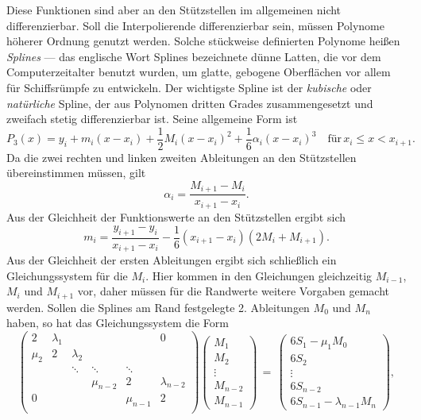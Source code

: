 Diese Funktionen sind aber an den Stützstellen im allgemeinen nicht
differenzierbar. Soll die Interpolierende differenzierbar sein, müssen
Polynome höherer Ordnung genutzt werden. Solche stückweise definierten
Polynome heißen \emph{Splines} --- das englische Wort Splines
bezeichnete dünne Latten, die vor dem Computerzeitalter benutzt
wurden, um glatte, gebogene Oberflächen vor allem für Schiffsrümpfe zu
entwickeln. Der wichtigste Spline ist der \emph{kubische} oder
\emph{natürliche}
Spline, der aus
Polynomen dritten Grades zusammengesetzt und zweifach stetig
differenzierbar ist. Seine allgemeine Form ist
\begin{equation}
  P_3(x) = y_i + m_i(x-x_i) + \frac{1}{2}M_i(x-x_i)^2 + \frac{1}{6}\alpha_i(x-x_i)^3
  \quad\text{für}\, x_i \le x < x_{i+1}.
\end{equation}
Da die zwei rechten und linken zweiten Ableitungen an den Stützstellen
übereinstimmen müssen, gilt
\begin{equation}
  \alpha_i = \frac{M_{i+1} - M_i}{x_{i+1} - x_i}.
\end{equation}
Aus der Gleichheit der Funktionswerte an den Stützstellen ergibt sich
\begin{equation}
  m_i = \frac{y_{i+1} - y_i}{x_{i+1}-x_i} -
  \frac{1}{6}(x_{i+1}-x_i)(2M_i + M_{i+1}).
\end{equation}
Aus der Gleichheit der ersten Ableitungen ergibt sich schließlich ein
Gleichungssystem für die $M_i$. Hier kommen in den Gleichungen
gleichzeitig $M_{i-1}$, $M_i$ und $M_{i+1}$ vor, daher müssen für die
Randwerte weitere Vorgaben gemacht werden. Sollen die Splines am Rand
festgelegte 2. Ableitungen $M_0$ und $M_n$ haben, so hat das
Gleichungssystem die Form
\begin{equation}
  \label{eq:spline1}
  \begin{pmatrix}
    2      & \lambda_1 &           &           &           &         0 \\
    \mu_2  & 2         & \lambda_2 \\
           &           & \ddots    & \ddots    & \ddots \\
           &           &           & \mu_{n-2}  & 2         & \lambda_{n-2} \\
    0      &           &           &           & \mu_{n-1}  & 2         \\
  \end{pmatrix}
  \begin{pmatrix}
    M_1\\
    M_2\\
    \vdots\\
    M_{n-2}\\
    M_{n-1}
  \end{pmatrix} \,=\,
  \begin{pmatrix}
    6S_1 - \mu_1 M_0\\
    6S_2\\
    \vdots\\
    6S_{n-2} \\
    6S_{n-1} -  \lambda_{n-1} M_n
  \end{pmatrix},
\end{equation}
